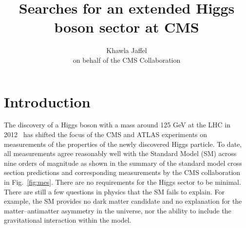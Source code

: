 \documentclass{blois}
\begin{document}
\vspace*{4cm}
\title{Searches for an extended Higgs boson sector at CMS}

\author{Khawla Jaffel\\
on behalf of the CMS Collaboration}
\address{UCLouvain Center for Cosmology, \\
Particle Physics and Phenomenology, (Belgium).}

\maketitle{}
\section{Introduction}
    The discovery of a Higgs boson with a mass around 125 GeV at the LHC in 2012~\cite{20121,201230}
has shifted the focus of the CMS and ATLAS experiments on measurements of the properties of the newly
discovered Higgs particle. To date, all measurements agree reasonably well with the Standard
Model (SM) across nine orders of magnitude as shown in the summary of the standard model cross section predictions and corresponding measurements by the CMS collaboration~\cite{Collaboration_2008} in Fig.~\ref{fig:mes}. There are no requirements for the Higgs sector to be minimal. There are still a few questions in physics that the SM fails to explain.  For example, the SM provides no dark matter candidate and no
explanation for the matter–antimatter asymmetry in the universe, nor the ability to include the gravitational interaction within the model. %
\end{document}
